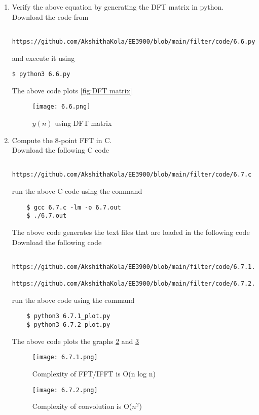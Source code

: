 \documentclass[journal,12pt,twocolumn]{IEEEtran}
\renewcommand\thesection{\arabic{section}}
\begin{document}
\begin{enumerate}[label=\thesection.\arabic*
,ref=\thesection.\theenumi]
\begin{align}
	\mtx{x} = \mathcal{F}^{-1}\brak{\mtx{X}} = \mtx{W}^{-1}\mtx{X} &= \frac{1}{N}\mtx{W^{H}}\mtx{X} = \frac{1}{N}\mtx{X}\mtx{W^{H}} \\ 
	\implies \mtx{W}^{-1} &= \frac{1}{N}\mtx{W^{H}}
\end{align}
\noindent where $H$ denotes hermitian operator. We can rewrite \eqref{6.2} using the element-wise multiplication operator as
\begin{align}
	\mtx{Y} = \mtx{H}\cdot\mtx{X} = \brak{\mtx{W}\mtx{h}}\cdot\brak{\mtx{W}\mtx{x}}
\end{align}
\item Verify the above equation by generating the DFT matrix in python.\\
\solution Download the code from
\begin{lstlisting}
	https://github.com/AkshithaKola/EE3900/blob/main/filter/code/6.6.py
\end{lstlisting}
and execute it using
\begin{lstlisting}
$ python3 6.6.py
\end{lstlisting}
The above code plots \eqref{fig:DFT matrix}
\begin{figure}
\centering
\texttt{[image: 6.6.png]}
\caption{$y(n)$ using DFT matrix}
\label{fig:DFT matrix}
\end{figure}
\item Compute the 8-point FFT in C.\\
\solution Download the following C code 
\begin{lstlisting}
	https://github.com/AkshithaKola/EE3900/blob/main/filter/code/6.7.c
\end{lstlisting}
run the above C code using the command
\begin{lstlisting}
	$ gcc 6.7.c -lm -o 6.7.out
	$ ./6.7.out
\end{lstlisting}
The above code generates the text files that are loaded in the following code \\
Download the following code 
\begin{lstlisting}
	https://github.com/AkshithaKola/EE3900/blob/main/filter/code/6.7.1.py
	https://github.com/AkshithaKola/EE3900/blob/main/filter/code/6.7.2.py
\end{lstlisting}
run the above code using the command
\begin{lstlisting}
	$ python3 6.7.1_plot.py
	$ python3 6.7.2_plot.py
\end{lstlisting}
The above code plots the graphs \ref{fig:complexity fft/ifft} and \ref{fig:Complexity convolution}
\begin{figure}
\centering
\texttt{[image: 6.7.1.png]}
\caption{Complexity of FFT/IFFT is O(n log n)}
\label{fig:complexity fft/ifft}
\end{figure}
\begin{figure}
\centering
\texttt{[image: 6.7.2.png]}
\caption{Complexity of convolution is O($n^2$)}
\label{fig:Complexity convolution}
\end{figure}
\end{enumerate}
\end{document}
